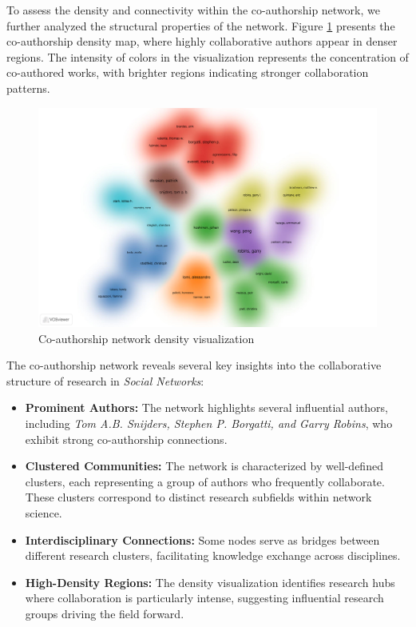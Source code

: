 \documentclass[twocolumn]{article}
\begin{document}
		To assess the density and connectivity within the co-authorship network, we further analyzed the structural properties of the network. Figure \ref{fig.fig14} presents the co-authorship density map, where highly collaborative authors appear in denser regions. The intensity of colors in the visualization represents the concentration of co-authored works, with brighter regions indicating stronger collaboration patterns.
		
		\begin{figure}[htbp]
			\centering
			\includegraphics[width=\columnwidth]{Social Networks/WOS data/VOS/co-authorship-density.pdf}
			\caption{Co-authorship network density visualization}
			\label{fig.fig14}
		\end{figure}
		
		The co-authorship network reveals several key insights into the collaborative structure of research in \textit{Social Networks}:
		
		\begin{itemize}
			\item \textbf{Prominent Authors:} The network highlights several influential authors, including \textit{Tom A.B. Snijders, Stephen P. Borgatti, and Garry Robins}, who exhibit strong co-authorship connections.
			\item \textbf{Clustered Communities:} The network is characterized by well-defined clusters, each representing a group of authors who frequently collaborate. These clusters correspond to distinct research subfields within network science.
			\item \textbf{Interdisciplinary Connections:} Some nodes serve as bridges between different research clusters, facilitating knowledge exchange across disciplines.
			\item \textbf{High-Density Regions:} The density visualization identifies research hubs where collaboration is particularly intense, suggesting influential research groups driving the field forward.
		\end{itemize}
		
\end{document}
